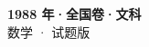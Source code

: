 \documentclass[zihao=-4, a4paper]{ctexart}
\begin{document}
\begin{center}
  {\Large\bfseries 1988 年·全国卷·文科}\\[4pt]
  {\large 数学 · 试题版}
\end{center}
\medskip
{}

\end{document}
